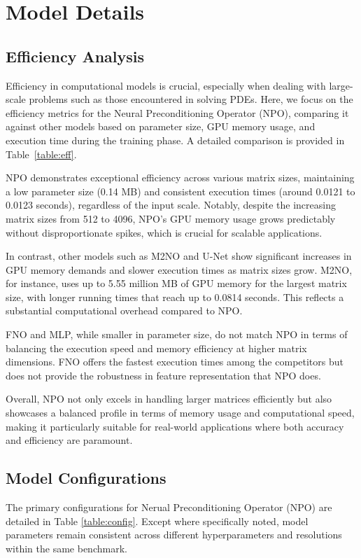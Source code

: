 \section{Model Details}
\label{appendix:detail}

\subsection{Efficiency Analysis}
\label{subsec:efficiency}

Efficiency in computational models is crucial, especially when dealing with large-scale problems such as those encountered in solving PDEs. Here, we focus on the efficiency metrics for the Neural Preconditioning Operator (NPO), comparing it against other models based on parameter size, GPU memory usage, and execution time during the training phase. A detailed comparison is provided in Table~\ref{table:eff}.

NPO demonstrates exceptional efficiency across various matrix sizes, maintaining a low parameter size (0.14 MB) and consistent execution times (around 0.0121 to 0.0123 seconds), regardless of the input scale. Notably, despite the increasing matrix sizes from 512 to 4096, NPO's GPU memory usage grows predictably without disproportionate spikes, which is crucial for scalable applications.

In contrast, other models such as M2NO and U-Net show significant increases in GPU memory demands and slower execution times as matrix sizes grow. M2NO, for instance, uses up to 5.55 million MB of GPU memory for the largest matrix size, with longer running times that reach up to 0.0814 seconds. This reflects a substantial computational overhead compared to NPO.

FNO and MLP, while smaller in parameter size, do not match NPO in terms of balancing the execution speed and memory efficiency at higher matrix dimensions. FNO offers the fastest execution times among the competitors but does not provide the robustness in feature representation that NPO does.

Overall, NPO not only excels in handling larger matrices efficiently but also showcases a balanced profile in terms of memory usage and computational speed, making it particularly suitable for real-world applications where both accuracy and efficiency are paramount.

\subsection{Model Configurations}
The primary configurations for Nerual Preconditioning Operator (NPO) are detailed in Table \ref{table:config}. Except where specifically noted, model parameters remain consistent across different hyperparameters and resolutions within the same benchmark.

